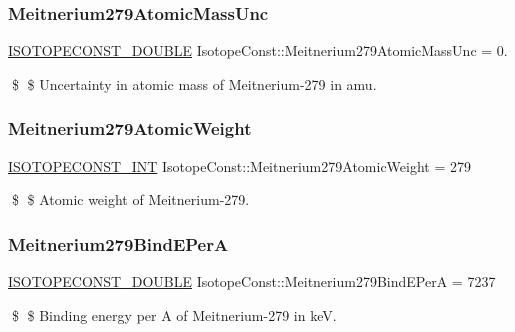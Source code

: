 \subsubsection{\texorpdfstring{Meitnerium279\+Atomic\+Mass\+Unc}{Meitnerium279AtomicMassUnc}}
{\footnotesize\ttfamily \mbox{\hyperlink{group___isotope_const-_macros_ga8f45a7272ce02c0b4c65c44636ed719a}{I\+S\+O\+T\+O\+P\+E\+C\+O\+N\+S\+T\+\_\+\+D\+O\+U\+B\+LE}} Isotope\+Const\+::\+Meitnerium279\+Atomic\+Mass\+Unc = 0.}

\$ \$ Uncertainty in atomic mass of Meitnerium-\/279 in amu. \mbox{\label{group___isotope_const-_meitnerium-_mt279_ga3f25fa3b0793af8c6b2385a11f83539e}} 
\subsubsection{\texorpdfstring{Meitnerium279\+Atomic\+Weight}{Meitnerium279AtomicWeight}}
{\footnotesize\ttfamily \mbox{\hyperlink{group___isotope_const-_macros_ga5f18360b3e99483a35c32d789e62621c}{I\+S\+O\+T\+O\+P\+E\+C\+O\+N\+S\+T\+\_\+\+I\+NT}} Isotope\+Const\+::\+Meitnerium279\+Atomic\+Weight = 279}

\$ \$ Atomic weight of Meitnerium-\/279. \mbox{\label{group___isotope_const-_meitnerium-_mt279_ga4c19d00e12cd3411293b6dd00d566743}} 
\subsubsection{\texorpdfstring{Meitnerium279\+Bind\+E\+PerA}{Meitnerium279BindEPerA}}
{\footnotesize\ttfamily \mbox{\hyperlink{group___isotope_const-_macros_ga8f45a7272ce02c0b4c65c44636ed719a}{I\+S\+O\+T\+O\+P\+E\+C\+O\+N\+S\+T\+\_\+\+D\+O\+U\+B\+LE}} Isotope\+Const\+::\+Meitnerium279\+Bind\+E\+PerA = 7237}

\$ \$ Binding energy per A of Meitnerium-\/279 in keV. \mbox{\label{group___isotope_const-_meitnerium-_mt279_gaf6e61b10c2eee52102eeca2fe075d3a9}} 
